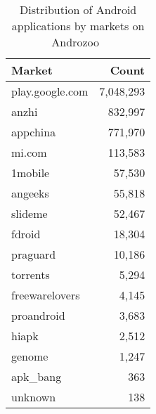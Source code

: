 \begin{table}[!ht]
\centering
  \label{table:background:markets}
  \caption[Distribution of Android applications by markets on Androzoo]{Distribution of Android applications by markets on Androzoo~\cite{allix_androzoo:_2016}}
  \begin{tabular}{| l | r |}
    \hline
    \textbf{Market} & \textbf{Count} \\ \hline
    play.google.com & 7,048,293 \\ \hline
    anzhi           & 832,997 \\ \hline
    appchina        & 771,970 \\ \hline
    mi.com          & 113,583 \\ \hline
    1mobile         & 57,530 \\ \hline
    angeeks         & 55,818 \\ \hline
    slideme         & 52,467 \\ \hline
    fdroid          & 18,304 \\ \hline
    praguard        & 10,186 \\ \hline
    torrents        & 5,294 \\ \hline
    freewarelovers  & 4,145 \\ \hline
    proandroid      & 3,683 \\ \hline
    hiapk           & 2,512 \\ \hline
    genome          & 1,247 \\ \hline
    apk\_bang        & 363 \\ \hline
    unknown         & 138 \\
    \hline
  \end{tabular}
\end{table}
